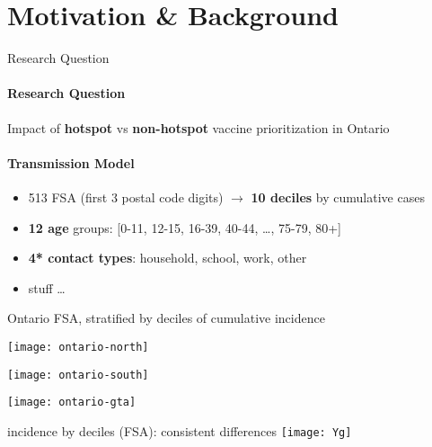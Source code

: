 \section{Motivation \& Background}
\begin{frame}{Research Question}
  \paragraph{Research Question}
  Impact of \textbf{hotspot} vs \textbf{non-hotspot}
  \covid vaccine prioritization in Ontario
  \bigskip
  \paragraph{Transmission Model}
  \begin{itemize}
    \item 513 FSA (first 3 postal code digits) $\rightarrow$ \textbf{10 deciles} by cumulative cases
    \item \textbf{12 age} groups: [0-11, 12-15, 16-39, 40-44, \dots, 75-79, 80+]
    \item \textbf{4* contact types}: household, school, work, other
    \item \covid stuff \dots
  \end{itemize}
\end{frame}
\begin{frame}{Ontario FSA, stratified by deciles of cumulative \covid incidence}
  \begin{minipage}{0.30\linewidth}
    \texttt{[image: ontario-north]}
  \end{minipage}%
  \begin{minipage}{0.35\linewidth}
    \texttt{[image: ontario-south]}
  \end{minipage}%
  \begin{minipage}{0.35\linewidth}
    \texttt{[image: ontario-gta]}
  \end{minipage}%
\end{frame}
\begin{frame}{\Covid incidence by deciles (FSA): consistent differences}
  \centering\texttt{[image: Yg]}
\end{frame}
